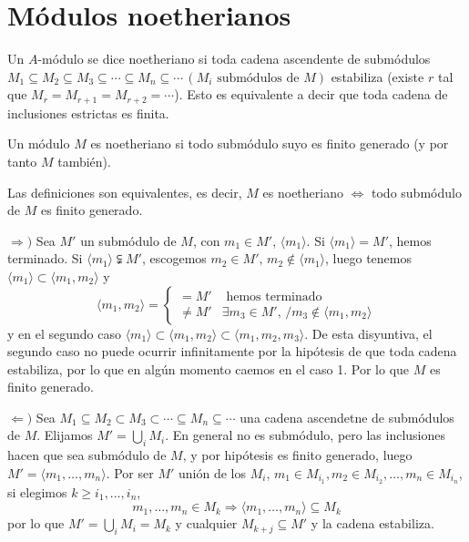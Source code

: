 \section{M\'odulos noetherianos}
\begin{defi}
    Un $A$-m\'odulo se dice noetheriano si toda cadena ascendente de subm\'odulos $M_1\subseteq M_2 \subseteq M_3 \subseteq \cdots \subseteq M_n \subseteq \cdots \, (M_i \text{ subm\'odulos de } M)$ estabiliza (existe $r$ tal que $M_r = M_{r+1} = M_{r+2} = \cdots$). Esto es equivalente a decir que toda cadena de inclusiones estrictas es finita. 
\end{defi}
\begin{defi}
    Un m\'odulo $M$ es noetheriano si todo subm\'odulo suyo es finito generado (y por tanto $M$ tambi\'en).
\end{defi}
\begin{prop} Las definiciones son equivalentes, es decir, $M$ es noetheriano $\iff$ todo subm\'odulo de $M$ es finito generado.
\end{prop}
\begin{dem}
    $\Rightarrow)$ Sea $M'$ un subm\'odulo de $M$, con $m_1 \in M'$, $\langle m_1\rangle$. Si $\langle m_1\rangle = M'$, hemos terminado. Si $\langle m_1\rangle\subsetneqq M'$, escogemos $m_2\in M', \, m_2\nin \langle m_1\rangle$, luego tenemos $\langle m_1\rangle \subset \langle m_1, m_2\rangle$ y 
    $$\langle m_1, m_2\rangle = \left\{ \begin{array}{ll}
         = M' & \text{ hemos terminado} \\
         \neq M' & \exists m_3\in M', \, / m_3 \nin \langle m_1, m_2\rangle
    \end{array} \right.$$
    y en el segundo caso $\langle m_1\rangle \subset \langle m_1, m_2\rangle \subset \langle m_1,m_2,m_3\rangle$. De esta disyuntiva, el segundo caso no puede ocurrir infinitamente por la hip\'otesis de que toda cadena estabiliza, por lo que en alg\'un momento caemos en el caso 1. Por lo que $M$ es finito generado. 

    $\Leftarrow)$ Sea $M_1\subseteq M_2 \subset M_3 \subset \cdots \subseteq M_n \subseteq \cdots$ una cadena ascendetne de subm\'odulos de $M$. Elijamos $\displaystyle M' = \bigcup_i M_i$. En general no es subm\'odulo, pero las inclusiones hacen que sea subm\'odulo de $M$, y por hip\'otesis es finito generado, luego $M' =\langle m_1, \ldots, m_n \rangle$. Por ser $M'$ uni\'on de los $M_i$, $m_1 \in M_{i_1}, m_2 \in M_{i_2}, \ldots, m_n \in M_{i_n}$, si elegimos $k \geq i_1, \ldots, i_n$, 
    $$m_1, \ldots, m_n \in M_k \Rightarrow \langle m_1, \ldots, m_n \rangle \subseteq M_k$$
    por lo que $\displaystyle M' = \bigcup_i M_i = M_k$ y cualquier $M_{k+j} \subseteq M'$ y la cadena estabiliza. 
\end{dem}

